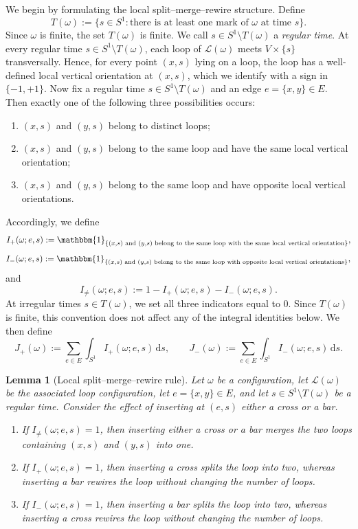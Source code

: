 \documentclass[11pt]{article}
\newtheorem{lemma}[theorem]{Lemma}
\theoremstyle{remark}
\theoremstyle{plain}
\newcommand{\1}{\mathbbm{1}}
\newcommand{\dd}{\mathrm{d}}
\newcommand{\cL}{\mathcal{L}}
\begin{document}
We begin by formulating the local split--merge--rewire structure. Define
\[
T(\omega):=\{s\in S^1:\text{there is at least one mark of }\omega\text{ at time }s\}.
\]
Since \(\omega\) is finite, the set \(T(\omega)\) is finite. We call
\(s\in S^1\setminus T(\omega)\) a \emph{regular time}.
At every regular time \(s\in S^1\setminus T(\omega)\), each loop of \(\cL(\omega)\)
meets \(V\times\{s\}\) transversally. Hence, for every point \((x,s)\) lying on a
loop, the loop has a well-defined local vertical orientation at \((x,s)\), which we
identify with a sign in \(\{-1,+1\}\).
Now fix a regular time \(s\in S^1\setminus T(\omega)\) and an edge \(e=\{x,y\}\in E\).
Then exactly one of the following three possibilities occurs:
\begin{enumerate}[label=(\alph*)]
    \item \((x,s)\) and \((y,s)\) belong to distinct loops;
    \item \((x,s)\) and \((y,s)\) belong to the same loop and have the same local
    vertical orientation;
    \item \((x,s)\) and \((y,s)\) belong to the same loop and have opposite local
    vertical orientations.
\end{enumerate}
Accordingly, we define
\[
I_+(\omega;e,s)
:=
\1_{\{(x,s)\text{ and }(y,s)\text{ belong to the same loop with the same local vertical orientation}\}},
\]
\[
I_-(\omega;e,s)
:=
\1_{\{(x,s)\text{ and }(y,s)\text{ belong to the same loop with opposite local vertical orientations}\}},
\]
and
\[
I_{\neq}(\omega;e,s):=1-I_+(\omega;e,s)-I_-(\omega;e,s).
\]
At irregular times \(s\in T(\omega)\), we set all three indicators equal to \(0\).
Since \(T(\omega)\) is finite, this convention does not affect any of the integral
identities below.
We then define
\[
J_+(\omega):=\sum_{e\in E}\int_{S^1} I_+(\omega;e,s)\,\dd s,
\qquad
J_-(\omega):=\sum_{e\in E}\int_{S^1} I_-(\omega;e,s)\,\dd s.
\]

\begin{lemma}[Local split--merge--rewire rule]
\label{lem:local-surgery}
Let \(\omega\) be a configuration, let \(\cL(\omega)\) be the associated loop
configuration, let \(e=\{x,y\}\in E\), and let \(s\in S^1\setminus T(\omega)\) be a
regular time. Consider the effect of inserting at \((e,s)\) either a cross or a bar.

\begin{enumerate}[label=(\roman*)]
    \item If \(I_{\neq}(\omega;e,s)=1\), then inserting either a cross or a bar
    merges the two loops containing \((x,s)\) and \((y,s)\) into one.

    \item If \(I_+(\omega;e,s)=1\), then inserting a cross splits the loop into two,
    whereas inserting a bar rewires the loop without changing the number of loops.

    \item If \(I_-(\omega;e,s)=1\), then inserting a bar splits the loop into two,
    whereas inserting a cross rewires the loop without changing the number of loops.
\end{enumerate}
\end{lemma}
\end{document}
